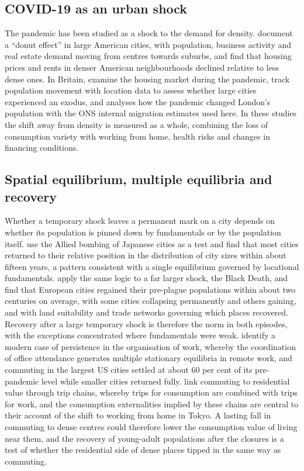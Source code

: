 \documentclass[11pt,a4paper]{article}
\begin{document}
\subsection{COVID-19 as an urban shock}

The pandemic has been studied as a shock to the demand for density. \citet{ramani2021} document a ``donut effect'' in large American cities, with population, business activity and real estate demand moving from centres towards suburbs, and \citet{liu2021} find that housing prices and rents in denser American neighbourhoods declined relative to less dense ones. In Britain, \citet{cheshire2021} examine the housing market during the pandemic, \citet{rowe2023} track population movement with location data to assess whether large cities experienced an exodus, and \citet{lange2024} analyses how the pandemic changed London's population with the ONS internal migration estimates used here. In these studies the shift away from density is measured as a whole, combining the loss of consumption variety with working from home, health risks and changes in financing conditions.

\subsection{Spatial equilibrium, multiple equilibria and recovery}\label{sec:lit_eq}

Whether a temporary shock leaves a permanent mark on a city depends on whether its population is pinned down by fundamentals or by the population itself. \citet{davis2002} use the Allied bombing of Japanese cities as a test and find that most cities returned to their relative position in the distribution of city sizes within about fifteen years, a pattern consistent with a single equilibrium governed by locational fundamentals. \citet{jedwab2019} apply the same logic to a far larger shock, the Black Death, and find that European cities regained their pre-plague populations within about two centuries on average, with some cities collapsing permanently and others gaining, and with land suitability and trade networks governing which places recovered. Recovery after a large temporary shock is therefore the norm in both episodes, with the exceptions concentrated where fundamentals were weak. \citet{monte2026} identify a modern case of persistence in the organisation of work, whereby the coordination of office attendance generates multiple stationary equilibria in remote work, and commuting in the largest US cities settled at about 60 per cent of its pre-pandemic level while smaller cities returned fully. \citet{miyauchi2025} link commuting to residential value through trip chains, whereby trips for consumption are combined with trips for work, and the consumption externalities implied by these chains are central to their account of the shift to working from home in Tokyo. A lasting fall in commuting to dense centres could therefore lower the consumption value of living near them, and the recovery of young-adult populations after the closures is a test of whether the residential side of dense places tipped in the same way as commuting.
\end{document}
